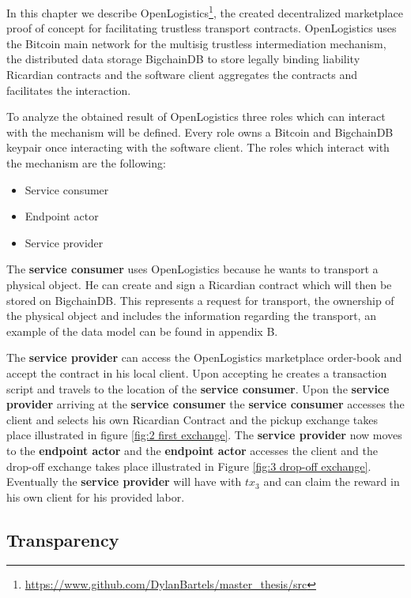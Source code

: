 In this chapter we describe OpenLogistics\footnote{\url{https://www.github.com/DylanBartels/master_thesis/src}}, the created decentralized marketplace proof of concept for facilitating trustless transport contracts. OpenLogistics uses the Bitcoin main network for the multisig trustless intermediation mechanism, the distributed data storage BigchainDB to store legally binding liability Ricardian contracts and the software client aggregates the contracts and facilitates the interaction. \par
To analyze the obtained result of OpenLogistics three roles which can interact with the mechanism will be defined. Every role owns a Bitcoin and BigchainDB keypair once interacting with the software client. The roles which interact with the mechanism are the following:
\begin{itemize}
  \item Service consumer
  \item Endpoint actor
  \item Service provider
\end{itemize}
The \textbf{service consumer} uses OpenLogistics because he wants to transport a physical object. He can create and sign a Ricardian contract which will then be stored on BigchainDB. This represents a request for transport, the ownership of the physical object and includes the information regarding the transport, an example of the data model can be found in appendix B. \par

The \textbf{service provider} can access the OpenLogistics marketplace order-book and accept the contract in his local client. Upon accepting he creates a transaction script and travels to the location of the \textbf{service consumer}. Upon the \textbf{service provider} arriving at the \textbf{service consumer} the \textbf{service consumer} accesses the client and selects his own Ricardian Contract and the pickup exchange takes place illustrated in figure \ref{fig:2 first exchange}. The \textbf{service provider} now moves to the \textbf{endpoint actor} and the \textbf{endpoint actor} accesses the client and the drop-off exchange takes place illustrated in Figure \ref{fig:3 drop-off exchange}. Eventually the \textbf{service provider} will have with $tx_3$ and can claim the reward in his own client for his provided labor. \par

\subsection{Transparency}

